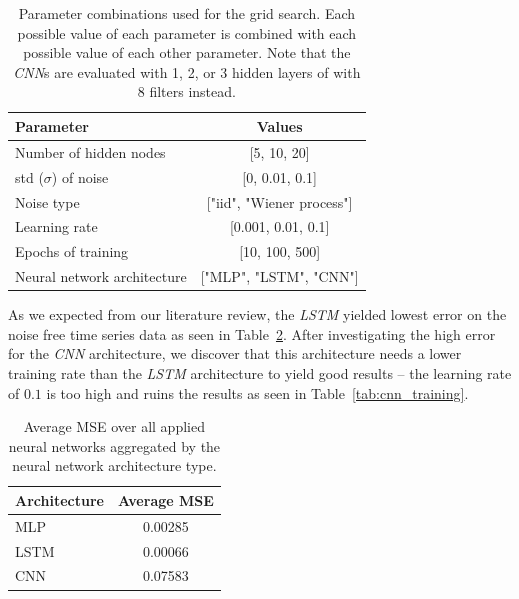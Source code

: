 \documentclass{article}
\begin{document}
\begin{table}
    \centering
    \begin{tabular}{l|c}
        Parameter                   & Values                    \\
        \hline
        Number of hidden nodes      & [5, 10, 20]               \\
        std ($\sigma$) of noise     & [0, 0.01, 0.1]            \\
        Noise type                  & ["iid", "Wiener process"] \\
        Learning rate               & [0.001, 0.01, 0.1]        \\
        Epochs of training          & [10, 100, 500]            \\
        Neural network architecture & ["MLP", "LSTM", "CNN"]    \\
    \end{tabular}
    \caption{Parameter combinations used for the grid search. Each possible value
        of each parameter is combined with each possible value of each other
        parameter. Note that the \emph{CNN}s are evaluated with 1, 2, or 3 hidden
        layers of with 8 filters instead.}
    \label{tab:gridparameters}
\end{table}

As we expected from our literature review, the \emph{LSTM} yielded lowest error
on the noise free time series data as seen in Table~\ref{tab:noisefree_result}.
After investigating the high error for the \emph{CNN} architecture, we discover
that this architecture needs a lower training rate than the \emph{LSTM}
architecture to yield good results -- the learning rate of $0.1$ is too high
and ruins the results as seen in Table~\ref{tab:cnn_training}.

\begin{table}
    \centering
    \begin{tabular}{l|c}
        Architecture & Average MSE \\
        \hline
        MLP          & 0.00285     \\
        LSTM         & 0.00066     \\
        CNN          & 0.07583     \\
    \end{tabular}
    \caption{Average MSE over all applied neural networks aggregated by
        the neural network architecture type.}
    \label{tab:noisefree_result}
\end{table}
\end{document}
